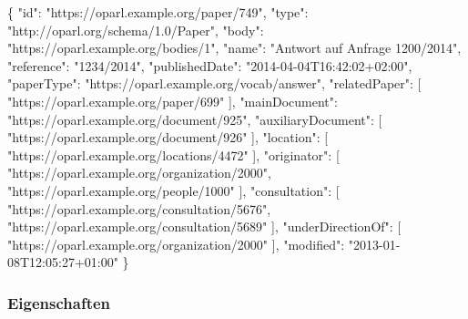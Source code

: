 \documentclass[,a4paper]{article}
\newenvironment{Shaded}{}{}
\newcommand{\DataTypeTok}[1]{\textcolor[rgb]{0.56,0.13,0.00}{{#1}}}
\newcommand{\StringTok}[1]{\textcolor[rgb]{0.25,0.44,0.63}{{#1}}}
\newcommand{\OtherTok}[1]{\textcolor[rgb]{0.00,0.44,0.13}{{#1}}}
\newcommand{\FunctionTok}[1]{\textcolor[rgb]{0.02,0.16,0.49}{{#1}}}
\begin{document}
\begin{Shaded}
\begin{Highlighting}[]
\FunctionTok{\{}
    \DataTypeTok{"id"}\FunctionTok{:} \StringTok{"https://oparl.example.org/paper/749"}\FunctionTok{,}
    \DataTypeTok{"type"}\FunctionTok{:} \StringTok{"http://oparl.org/schema/1.0/Paper"}\FunctionTok{,}
    \DataTypeTok{"body"}\FunctionTok{:} \StringTok{"https://oparl.example.org/bodies/1"}\FunctionTok{,}
    \DataTypeTok{"name"}\FunctionTok{:} \StringTok{"Antwort auf Anfrage 1200/2014"}\FunctionTok{,}
    \DataTypeTok{"reference"}\FunctionTok{:} \StringTok{"1234/2014"}\FunctionTok{,}
    \DataTypeTok{"publishedDate"}\FunctionTok{:} \StringTok{"2014-04-04T16:42:02+02:00"}\FunctionTok{,}
    \DataTypeTok{"paperType"}\FunctionTok{:} \StringTok{"https://oparl.example.org/vocab/answer"}\FunctionTok{,}
    \DataTypeTok{"relatedPaper"}\FunctionTok{:} \OtherTok{[}
        \StringTok{"https://oparl.example.org/paper/699"}
    \OtherTok{]}\FunctionTok{,}
    \DataTypeTok{"mainDocument"}\FunctionTok{:} \StringTok{"https://oparl.example.org/document/925"}\FunctionTok{,}
    \DataTypeTok{"auxiliaryDocument"}\FunctionTok{:} \OtherTok{[}
        \StringTok{"https://oparl.example.org/document/926"}
    \OtherTok{]}\FunctionTok{,}
    \DataTypeTok{"location"}\FunctionTok{:} \OtherTok{[}
        \StringTok{"https://oparl.example.org/locations/4472"}
    \OtherTok{]}\FunctionTok{,}
    \DataTypeTok{"originator"}\FunctionTok{:} \OtherTok{[}
        \StringTok{"https://oparl.example.org/organization/2000"}\OtherTok{,}
        \StringTok{"https://oparl.example.org/people/1000"}
    \OtherTok{]}\FunctionTok{,}
    \DataTypeTok{"consultation"}\FunctionTok{:} \OtherTok{[}
        \StringTok{"https://oparl.example.org/consultation/5676"}\OtherTok{,}
        \StringTok{"https://oparl.example.org/consultation/5689"}
    \OtherTok{]}\FunctionTok{,}
    \DataTypeTok{"underDirectionOf"}\FunctionTok{:} \OtherTok{[}
        \StringTok{"https://oparl.example.org/organization/2000"}
    \OtherTok{]}\FunctionTok{,}
    \DataTypeTok{"modified"}\FunctionTok{:} \StringTok{"2013-01-08T12:05:27+01:00"}
\FunctionTok{\}}
\end{Highlighting}
\end{Shaded}

\subsubsection{Eigenschaften}\label{eigenschaften-6}
\end{document}
